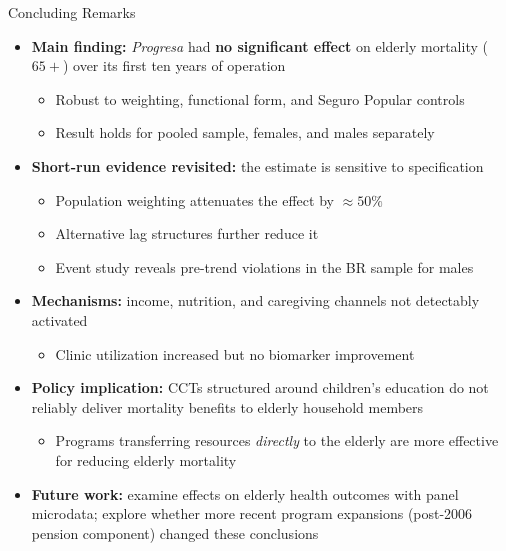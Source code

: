 \documentclass[aspectratio=169,usenames,dvipsnames]{beamer}
\newcommand{\smallcite}[1]{{\footnotesize\textcolor{Blue}{\citep{#1}}}}
\begin{document}
\begin{frame}{Concluding Remarks}\label{conclusion}
\small
\begin{itemize}
  \item[$\circ$] \textbf{Main finding:} \textit{Progresa} had \textbf{no significant effect} on elderly mortality ($65+$) over its first ten years of operation
    \begin{itemize}
      \item Robust to weighting, functional form, and Seguro Popular controls
      \item Result holds for pooled sample, females, and males separately
    \end{itemize}
  \vspace{4pt}
  \item[$\circ$] \textbf{Short-run evidence revisited:} the \smallcite{BarhamRowberry2013JDE} estimate is sensitive to specification
    \begin{itemize}
      \item Population weighting attenuates the effect by $\approx 50\%$
      \item Alternative lag structures further reduce it
      \item Event study reveals pre-trend violations in the BR sample for males
    \end{itemize}
  \vspace{4pt}
  \item[$\circ$] \textbf{Mechanisms:} income, nutrition, and caregiving channels not detectably activated
    \begin{itemize}
      \item Clinic utilization increased but no biomarker improvement \smallcite{aguila2024conditional}
    \end{itemize}
  \vspace{4pt}
  \item[$\circ$] \textbf{Policy implication:} CCTs structured around children's education do not reliably deliver mortality benefits to elderly household members
    \begin{itemize}
      \item Programs transferring resources \textit{directly} to the elderly are more effective for reducing elderly mortality \smallcite{jeon2025short, MiglinoNavarrete2023AEJP}
    \end{itemize}
  \vspace{4pt}
  \item[$\circ$] \textbf{Future work:} examine effects on elderly health outcomes with panel microdata; explore whether more recent program expansions (post-2006 pension component) changed these conclusions
\end{itemize}
\end{frame}
\end{document}

